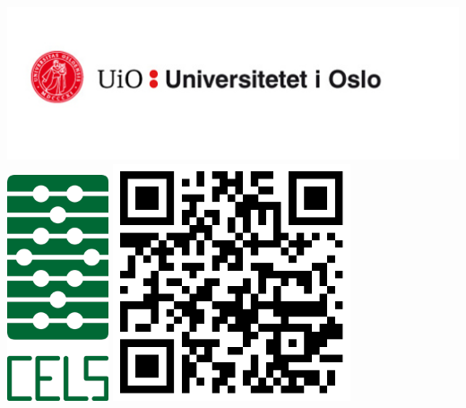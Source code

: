 \documentclass[a0,portrait]{a0poster}
\begin{document}
\begin{minipage}[b]{0.75\linewidth}
\includegraphics[width=25cm]{logo.jpg}\\
 \hspace*{5cm}\includegraphics[width=3cm]{cels.png} \hspace{2cm}
\includegraphics[width=7cm]{qrcode.png}\\
\end{minipage}


\end{document}

